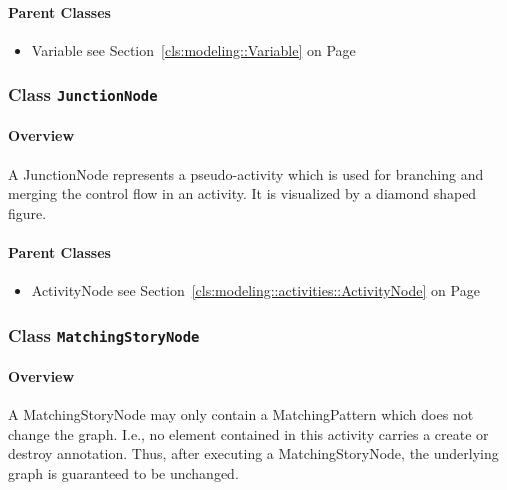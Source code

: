 \paragraph{Parent Classes}
\begin{itemize}
\item Variable see Section~\ref{cls:modeling::Variable} on Page~\pageref{cls:modeling::Variable}\end{itemize}
\subsubsection{\Large{Class \bfseries \texttt{JunctionNode}\normalfont}}
\label{cls:modeling::activities::JunctionNode} 
\paragraph{Overview}

	
			
A JunctionNode represents a pseudo-activity which is used for branching and merging the control flow in an activity. It is visualized by a diamond shaped figure.	
		
	



\paragraph{Parent Classes}
\begin{itemize}
\item ActivityNode see Section~\ref{cls:modeling::activities::ActivityNode} on Page~\pageref{cls:modeling::activities::ActivityNode}\end{itemize}
\subsubsection{\Large{Class \bfseries \texttt{MatchingStoryNode}\normalfont}}
\label{cls:modeling::activities::MatchingStoryNode} 
\paragraph{Overview}

	
			
A MatchingStoryNode may only contain a MatchingPattern which does not change the graph. I.e., no element contained in this activity carries a create or destroy annotation. Thus, after executing a MatchingStoryNode, the underlying graph is guaranteed to be unchanged.	
		
